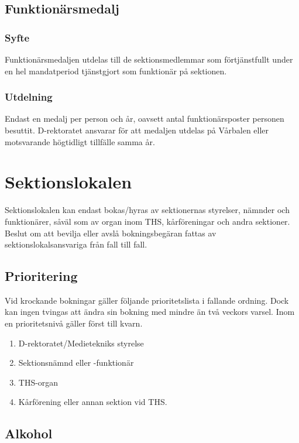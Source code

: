 \documentclass[a4paper,12pt]{article}
\begin{document}
\subsection{Funktionärsmedalj}

\subsubsection{Syfte}

Funktionärsmedaljen utdelas till de sektionsmedlemmar som förtjänstfullt under en hel mandatperiod tjänstgjort som funktionär på sektionen.

\subsubsection{Utdelning}

Endast en medalj per person och år, oavsett antal funktionärsposter personen besuttit. D-rektoratet ansvarar för att medaljen utdelas på Vårbalen eller motsvarande högtidligt tillfälle samma år.

\section{Sektionslokalen}

Sektionslokalen kan endast bokas/hyras av sektionernas styrelser, nämnder och funktionärer, såväl som av organ inom THS, kårföreningar och andra sektioner. Beslut om att bevilja eller avslå bokningsbegäran fattas av sektionslokalsansvariga från fall till fall.

\subsection{Prioritering}

Vid krockande bokningar gäller följande prioritetslista i fallande ordning. Dock kan
ingen tvingas att ändra sin bokning med mindre än två veckors varsel. Inom en prioritetsnivå gäller först till kvarn.

\begin{enumerate}
  \item D-rektoratet/Medietekniks styrelse
  \item Sektionsnämnd eller -funktionär
  \item THS-organ
  \item Kårförening eller annan sektion vid THS.
\end{enumerate}

\subsection{Alkohol}
\end{document}
